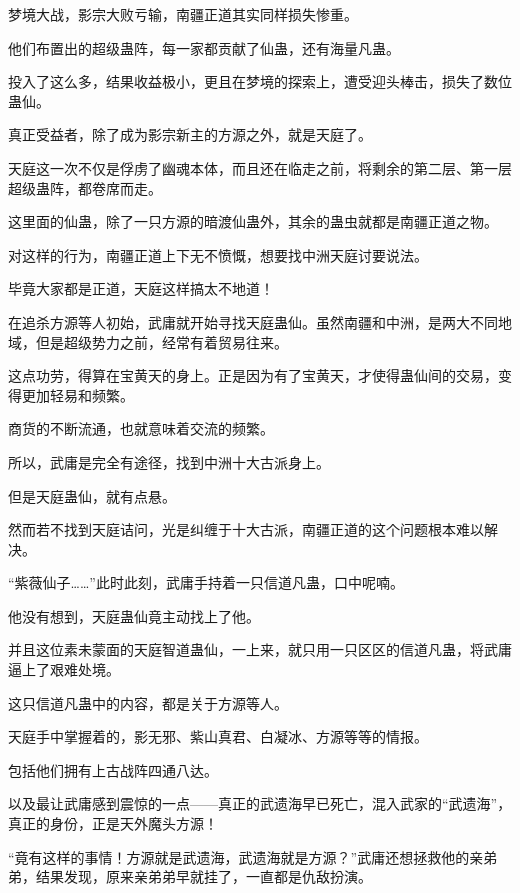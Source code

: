 
\begin{this_body}



梦境大战，影宗大败亏输，南疆正道其实同样损失惨重。

他们布置出的超级蛊阵，每一家都贡献了仙蛊，还有海量凡蛊。

投入了这么多，结果收益极小，更且在梦境的探索上，遭受迎头棒击，损失了数位蛊仙。

真正受益者，除了成为影宗新主的方源之外，就是天庭了。

天庭这一次不仅是俘虏了幽魂本体，而且还在临走之前，将剩余的第二层、第一层超级蛊阵，都卷席而走。

这里面的仙蛊，除了一只方源的暗渡仙蛊外，其余的蛊虫就都是南疆正道之物。

对这样的行为，南疆正道上下无不愤慨，想要找中洲天庭讨要说法。

毕竟大家都是正道，天庭这样搞太不地道！

在追杀方源等人初始，武庸就开始寻找天庭蛊仙。虽然南疆和中洲，是两大不同地域，但是超级势力之前，经常有着贸易往来。

这点功劳，得算在宝黄天的身上。正是因为有了宝黄天，才使得蛊仙间的交易，变得更加轻易和频繁。

商货的不断流通，也就意味着交流的频繁。

所以，武庸是完全有途径，找到中洲十大古派身上。

但是天庭蛊仙，就有点悬。

然而若不找到天庭诘问，光是纠缠于十大古派，南疆正道的这个问题根本难以解决。

“紫薇仙子……”此时此刻，武庸手持着一只信道凡蛊，口中呢喃。

他没有想到，天庭蛊仙竟主动找上了他。

并且这位素未蒙面的天庭智道蛊仙，一上来，就只用一只区区的信道凡蛊，将武庸逼上了艰难处境。

这只信道凡蛊中的内容，都是关于方源等人。

天庭手中掌握着的，影无邪、紫山真君、白凝冰、方源等等的情报。

包括他们拥有上古战阵四通八达。

以及最让武庸感到震惊的一点——真正的武遗海早已死亡，混入武家的“武遗海”，真正的身份，正是天外魔头方源！

“竟有这样的事情！方源就是武遗海，武遗海就是方源？”武庸还想拯救他的亲弟弟，结果发现，原来亲弟弟早就挂了，一直都是仇敌扮演。


\end{this_body}
